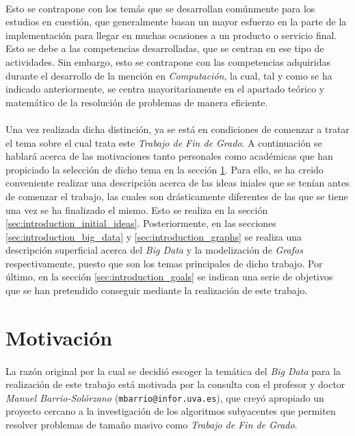 \documentclass{subfiles}
\begin{document}
      \paragraph{}
      Esto se contrapone con los temás que se desarrollan comúnmente para los estudios en cuestión, que generalmente basan un mayor esfuerzo en la parte de la  implementación para llegar en muchas ocasiones a un producto o servicio final. Esto se debe a las competencias desarrolladas, que se centran en ese tipo de actividades. Sin embargo, esto se contrapone con las competencias adquiridas durante el desarrollo de la mención en \emph{Computación}, la cual, tal y como se ha indicado anteriormente, se centra mayoritariamente en el apartado teórico y matemático de la resolución de problemas de manera eficiente.

      \paragraph{}
      Una vez realizada dicha distinción, ya se está en condiciones de comenzar a tratar el tema sobre el cual trata este \emph{Trabajo de Fin de Grado}. A continuación se hablará acerca de las motivaciones tanto personales como académicas que han propiciado la selección de dicho tema en la sección \ref{sec:introduction_motivation}. Para ello, se ha creido conveniente realizar una descripción acerca de las ideas iniales que se tenían antes de comenzar el trabajo, las cuales son drásticamente diferentes de las que se tiene una vez se ha finalizado el mismo. Esto se realiza en la sección \ref{sec:introduction_initial_ideas}. Posteriormente, en las secciones \ref{sec:introduction_big_data} y \ref{sec:introduction_graphs} se realiza una descripción superficial acerca del \emph{Big Data} y la modelización de \emph{Grafos} respectivamente, puesto que son los temas principales de dicho trabajo. Por último, en la sección \ref{sec:introduction_goals} se indican una serie de objetivos que se han pretendido conseguir mediante la realización de este trabajo.


    \section{Motivación}
    \label{sec:introduction_motivation}

      \paragraph{}
      La razón original por la cual se decidió escoger la temática del \emph{Big Data} para la realización de este trabajo está motivada por la consulta con el profesor y doctor \emph{Manuel Barrio-Solórzano} (\texttt{mbarrio@infor.uva.es}), que creyó apropiado un proyecto cercano a la investigación de los algoritmos subyacentes que permiten resolver problemas de tamaño masivo como \emph{Trabajo de Fin de Grado}.
\end{document}
